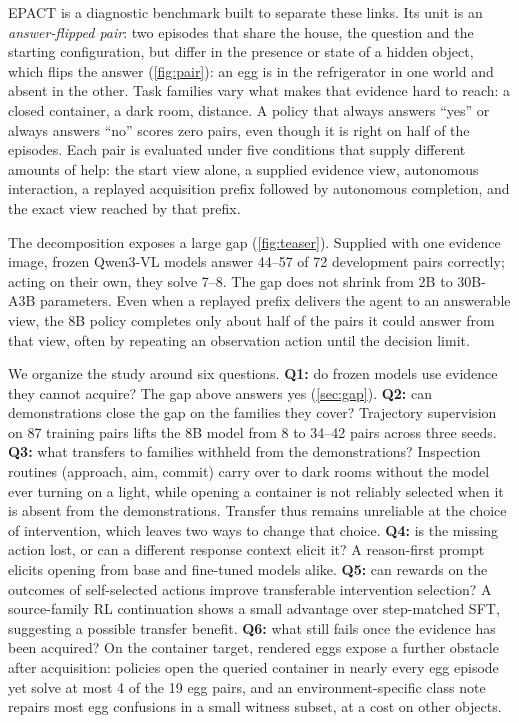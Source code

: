 \documentclass{article}
\begin{document}
EPACT is a diagnostic benchmark built to separate these links. Its unit is an \emph{answer-flipped pair}: two episodes that share the house, the question and the starting configuration, but differ in the presence or state of a hidden object, which flips the answer (\cref{fig:pair}): an egg is in the refrigerator in one world and absent in the other. Task families vary what makes that evidence hard to reach: a closed container, a dark room, distance. A policy that always answers ``yes'' or always answers ``no'' scores zero pairs, even though it is right on half of the episodes. Each pair is evaluated under five conditions that supply different amounts of help: the start view alone, a supplied evidence view, autonomous interaction, a replayed acquisition prefix followed by autonomous completion, and the exact view reached by that prefix.

The decomposition exposes a large gap (\cref{fig:teaser}). Supplied with one evidence image, frozen Qwen3-VL models \citep{bai2025qwen3vl} answer 44--57 of 72 development pairs correctly; acting on their own, they solve 7--8. The gap does not shrink from 2B to 30B-A3B parameters. Even when a replayed prefix delivers the agent to an answerable view, the 8B policy completes only about half of the pairs it could answer from that view, often by repeating an observation action until the decision limit.

We organize the study around six questions. \textbf{Q1:} do frozen models use evidence they cannot acquire? The gap above answers yes (\cref{sec:gap}). \textbf{Q2:} can demonstrations close the gap on the families they cover? Trajectory supervision on 87 training pairs lifts the 8B model from 8 to 34--42 pairs across three seeds. \textbf{Q3:} what transfers to families withheld from the demonstrations? Inspection routines (approach, aim, commit) carry over to dark rooms without the model ever turning on a light, while opening a container is not reliably selected when it is absent from the demonstrations. Transfer thus remains unreliable at the choice of intervention, which leaves two ways to change that choice. \textbf{Q4:} is the missing action lost, or can a different response context elicit it? A reason-first prompt elicits opening from base and fine-tuned models alike. \textbf{Q5:} can rewards on the outcomes of self-selected actions improve transferable intervention selection? A source-family RL continuation shows a small advantage over step-matched SFT, suggesting a possible transfer benefit. \textbf{Q6:} what still fails once the evidence has been acquired? On the container target, rendered eggs expose a further obstacle after acquisition: policies open the queried container in nearly every egg episode yet solve at most 4 of the 19 egg pairs, and an environment-specific class note repairs most egg confusions in a small witness subset, at a cost on other objects.
\end{document}
